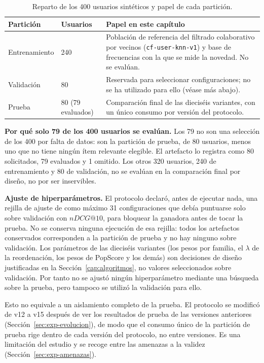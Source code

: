 \begin{table}[htp]
\centering
\small
\begin{tabularx}{\textwidth}{ | L{0.17\textwidth} | C{0.17\textwidth} | Y | }
    \hline
    \textbf{Partición} & \textbf{Usuarios} & \textbf{Papel en este capítulo} \\
    \hline
    Entrenamiento & 240 & Población de referencia del filtrado colaborativo por vecinos (\texttt{cf-user-knn-v1}) y base de frecuencias con la que se mide la novedad. No se evalúan. \\
    \hline
    Validación & 80 & Reservada para seleccionar configuraciones; no se ha utilizado para ello (véase más abajo). \\
    \hline
    Prueba & 80 (79 evaluados) & Comparación final de las dieciséis variantes, con un único consumo por versión del protocolo. \\
    \hline
\end{tabularx}
\caption{Reparto de los 400 usuarios sintéticos y papel de cada partición.}
\label{tab:exp-reparto}
\end{table}

\textbf{Por qué solo 79 de los 400 usuarios se evalúan.} Los 79 no son una selección de los 400 por falta de datos:
son la partición de prueba, de 80 usuarios, menos uno que no tiene ningún ítem relevante elegible. El artefacto lo
registra como 80 solicitados, 79 evaluados y 1 omitido. Los otros 320 usuarios, 240 de entrenamiento y 80 de
validación, no se evalúan en la comparación final por diseño, no por ser inservibles.

\textbf{Ajuste de hiperparámetros.} El protocolo declaró, antes de ejecutar nada, una rejilla de ajuste de como
máximo 31 configuraciones que debía puntuarse solo sobre validación con \(nDCG@10\), para bloquear la ganadora antes
de tocar la prueba. No se conserva ninguna ejecución de esa rejilla: todos los artefactos conservados corresponden a
la partición de prueba y no hay ninguno sobre validación. Los parámetros de las dieciséis variantes (los pesos por
familia, el \(\lambda\) de la reordenación, los pesos de PopScore y los demás) son decisiones de diseño justificadas
en la Sección~\ref{cap:algoritmos}, no valores seleccionados sobre validación. Por tanto no se ajustó ningún
hiperparámetro mediante una búsqueda sobre la prueba, pero tampoco se utilizó la validación para ello.

Esto no equivale a un aislamiento completo de la prueba. El protocolo se modificó de v12 a v15 después de ver los
resultados de prueba de las versiones anteriores (Sección~\ref{sec:exp-evolucion}), de modo que el consumo único de la
partición de prueba rige dentro de cada versión del protocolo, no entre versiones. Es una limitación del estudio y se
recoge entre las amenazas a la validez (Sección~\ref{sec:exp-amenazas}).

